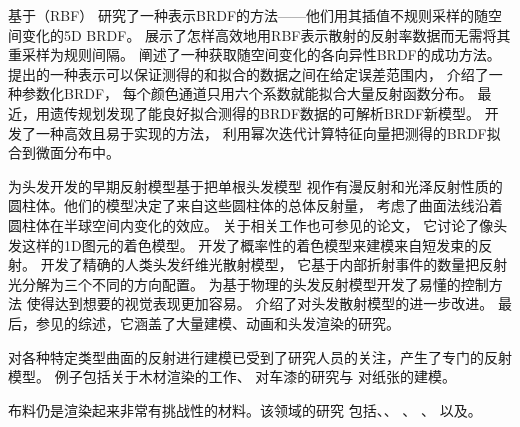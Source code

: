 \citet{10.5555/2383654.2383690}基于（RBF）
研究了一种表示BRDF的方法——他们用其插值不规则采样的随空间变化的5D BRDF。
\citet{weistroffer2007efficient}展示了怎样高效地用RBF表示散射的反射率数据而无需将其重采样为规则间隔。
\citet{10.1145/1399504.1360640}阐述了一种获取随空间变化的各向异性BRDF的成功方法。
\citet{6165276}提出的一种表示可以保证测得的和拟合的数据之间在给定误差范围内，
\citet{10.1111/j.1467-8659.2012.03147.x}介绍了一种参数化BRDF，
每个颜色通道只用六个系数就能拟合大量反射函数分布。
最近，\citet{10.1145/2601097.2601193}用遗传规划发现了能良好拟合测得的BRDF数据的可解析BRDF新模型。
\citet{10.1111/cgf.12675}开发了一种高效且易于实现的方法，
利用幂次迭代计算特征向量把测得的BRDF拟合到微面分布中。

\citet{10.1145/74333.74361}为头发开发的早期反射模型基于把单根头发模型
视作有漫反射和光泽反射性质的圆柱体。他们的模型决定了来自这些圆柱体的总体反射量，
考虑了曲面法线沿着圆柱体在半球空间内变化的效应。
关于相关工作也可参见\citet{10.1145/192161.192246}的论文，
它讨论了像头发这样的1D图元的着色模型。
\citet{10.1145/258734.258807}开发了概率性的着色模型来建模来自短发束的反射。
\citet{10.1145/882262.882345}开发了精确的人类头发纤维光散射模型，
它基于内部折射事件的数量把反射光分解为三个不同的方向配置。
\citet{10.1145/1778765.1778793}为基于物理的头发反射模型开发了易懂的控制方法
使得达到想要的视觉表现更加容易。
\citet{10.1111/j.1467-8659.2011.01976.x}介绍了对头发散射模型的进一步改进。
最后，参见\citet{4069232}的综述，它涵盖了大量建模、动画和头发渲染的研究。

对各种特定类型曲面的反射进行建模已受到了研究人员的关注，产生了专门的反射模型。
例子包括\citet{10.1145/1186822.1073254}关于木材渲染的工作、
\citet{guenther:05:carpaint}对车漆的研究与
\citet{10.1111/cgf.12420}对纸张的建模。

布料仍是渲染起来非常有挑战性的材料。该领域的研究
包括\citet{2003_sattler_egsr}、\citet{hdl.handle.net/1813/8331}、
\citet{10.1111/j.1467-8659.2011.01987.x}、
\citet{10.1145/2077341.2077352}、\citet{10.1145/2185520.2185571}
以及\citet{10.1145/2451236.2451240}。